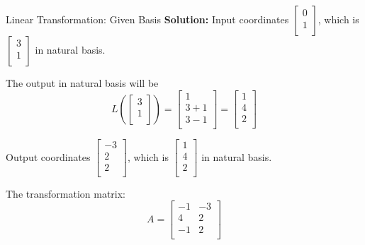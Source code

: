 \documentclass{beamer}
\begin{document}
\begin{frame}{Linear Transformation: Given Basis}
\textbf{Solution:}\newline
Input coordinates $\left[ \begin{array}{c}
    0\\
    1\\
\end{array} \right]$, which is $\left[ \begin{array}{c}
    3\\
    1\\
\end{array} \right]$ in natural basis.

The output in natural basis will be
\begin{equation*}
    L\left( \left[ \begin{array}{c}
        3\\
        1\\
    \end{array} \right] \right) =\left[ \begin{array}{c}
        1\\
        3+1\\
        3-1\\
    \end{array} \right] =\left[ \begin{array}{c}
        1\\
        4\\
        2\\
    \end{array} \right]
\end{equation*}

Output coordinates $\left[ \begin{array}{c}
    -3\\
    2\\
    2\\
\end{array} \right]$, which is $\left[ \begin{array}{c}
    1\\
    4\\
    2\\
\end{array} \right]$ in natural basis.

The transformation matrix:
\begin{equation*}
    A=\left[ \begin{matrix}
        -1&		-3\\
        4&		2\\
        -1&		2\\
    \end{matrix} \right]
\end{equation*}
\end{frame}
\end{document}
